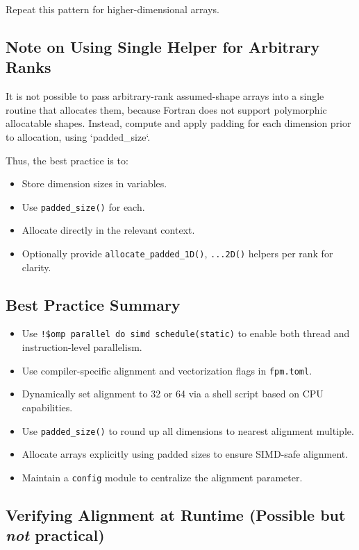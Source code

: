 \documentclass{article}
\begin{document}
Repeat this pattern for higher-dimensional arrays.

\subsection{Note on Using Single Helper for Arbitrary Ranks}

It is not possible to pass arbitrary-rank assumed-shape arrays into a single routine that allocates them, because Fortran does not support polymorphic allocatable shapes. Instead, compute and apply padding for each dimension prior to allocation, using `padded\_size`.

Thus, the best practice is to:
\begin{itemize}
\item Store dimension sizes in variables.
\item Use \texttt{padded\_size()} for each.
\item Allocate directly in the relevant context.
\item Optionally provide \texttt{allocate\_padded\_1D()}, \texttt{...2D()} helpers per rank for clarity.
\end{itemize}

\subsection{Best Practice Summary}

\begin{itemize}
\item Use \texttt{!\$omp parallel do simd schedule(static)} to enable both thread and instruction-level parallelism.
\item Use compiler-specific alignment and vectorization flags in \texttt{fpm.toml}.
\item Dynamically set alignment to 32 or 64 via a shell script based on CPU capabilities.
\item Use \texttt{padded\_size()} to round up all dimensions to nearest alignment multiple.
\item Allocate arrays explicitly using padded sizes to ensure SIMD-safe alignment.
\item Maintain a \texttt{config} module to centralize the alignment parameter.
\end{itemize}

\subsection{Verifying Alignment at Runtime (Possible but \emph{not} practical)}
\end{document}
